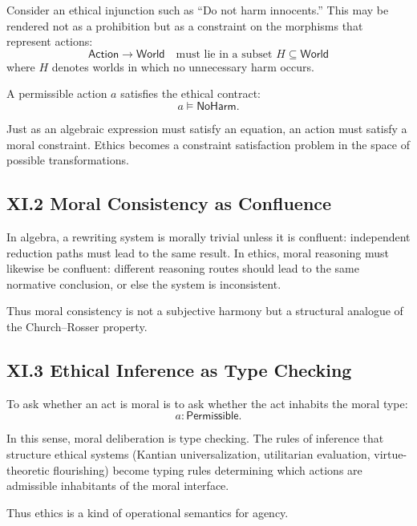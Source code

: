 \documentclass[12pt,letterpaper]{article}
\begin{document}
Consider an ethical injunction such as ``Do not harm innocents.'' This may be rendered not as a prohibition but as a constraint on the morphisms that represent actions:
\[
\mathsf{Action} \to \mathsf{World} \quad \text{must lie in a subset } H \subseteq \mathsf{World}
\]
where \(H\) denotes worlds in which no unnecessary harm occurs.

A permissible action \(a\) satisfies the ethical contract:
\[
a \vDash \mathsf{NoHarm}.
\]

Just as an algebraic expression must satisfy an equation, an action must satisfy a moral constraint. Ethics becomes a constraint satisfaction problem in the space of possible transformations.

\subsection{XI.2 Moral Consistency as Confluence}

In algebra, a rewriting system is morally trivial unless it is confluent: independent reduction paths must lead to the same result. In ethics, moral reasoning must likewise be confluent: different reasoning routes should lead to the same normative conclusion, or else the system is inconsistent.

Thus moral consistency is not a subjective harmony but a structural analogue of the Church–Rosser property.

\subsection{XI.3 Ethical Inference as Type Checking}

To ask whether an act is moral is to ask whether the act inhabits the moral type:
\[
a : \mathsf{Permissible}.
\]

In this sense, moral deliberation is type checking. The rules of inference that structure ethical systems (Kantian universalization, utilitarian evaluation, virtue-theoretic flourishing) become typing rules determining which actions are admissible inhabitants of the moral interface.

Thus ethics is a kind of operational semantics for agency.

\end{document}
